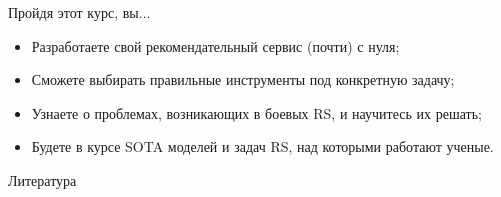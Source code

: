 \documentclass[11pt,aspectratio=169]{beamer}
\begin{document}
\begin{frame}{Пройдя этот курс, вы...}

\begin{itemize}
\item Разработаете свой рекомендательный сервис (почти) с нуля;
\item Сможете выбирать правильные инструменты под конкретную задачу;
\item Узнаете о проблемах, возникающих в боевых RS, и научитесь их решать;
\item Будете в курсе SOTA моделей и задач RS, над которыми работают ученые.
\end{itemize}

\end{frame}

\begin{frame}[allowframebreaks]{Литература}


\end{frame}
\end{document}
